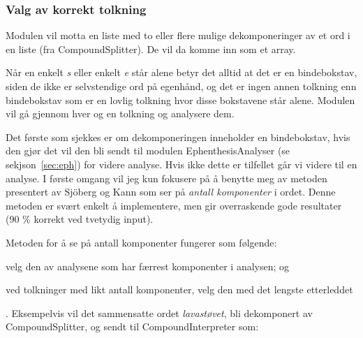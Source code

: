 \subsubsection{Valg av korrekt tolkning}
%

Modulen vil motta en liste med to eller flere mulige dekomponeringer av et ord i en liste (fra CompoundSplitter). De vil da komme inn som et array. 


Når en enkelt \textit{s} eller enkelt \textit{e} står alene betyr det alltid at det er en bindebokstav, siden de ikke er selvstendige ord på egenhånd, og det er ingen annen tolkning enn bindebokstav som er en lovlig tolkning hvor disse bokstavene står alene. Modulen vil gå gjennom hver og en tolkning og analysere dem. 

Det første som sjekkes er om dekomponeringen inneholder en bindebokstav, hvis den gjør det vil den bli sendt til modulen EphenthesisAnalyser (se sekjson~\ref{sec:eph}) for videre analyse. Hvis ikke dette er tilfellet går vi videre til en analyse. I første omgang vil jeg kun fokusere på å benytte meg av metoden presentert av Sjöberg og Kann \cite{sjobergh2004finding} som ser på \textit{antall komponenter} i ordet. Denne metoden er svært enkelt å implementere, men gir overraskende gode resultater (90 \% korrekt ved tvetydig input).

Metoden for å se på antall komponenter fungerer som følgende: 
\begin{inparaenum}
\item velg den av analysene som har færrest komponenter i analysen; og
\item ved tolkninger med likt antall komponenter, velg den med det lengste etterleddet
\end{inparaenum}. Eksempelvis vil det sammensatte ordet \textit{lavastøvet}, bli dekomponert av CompoundSplitter, og sendt til CompoundInterpreter som:

